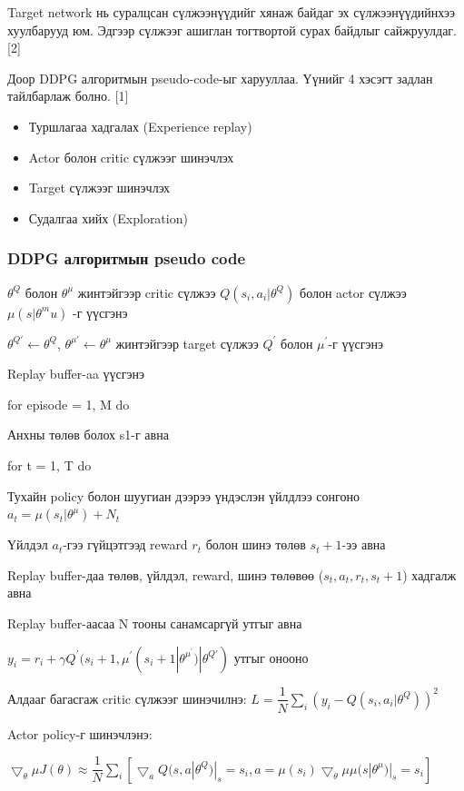 \documentclass[12pt,A4]{report}
\begin{document}
Target network нь суралцсан сүлжээнүүдийг хянаж байдаг эх сүлжээнүүдийнхээ хуулбарууд юм. Эдгээр сүлжээг ашиглан тогтвортой сурах байдлыг сайжруулдаг.	 [2]

Доор DDPG алгоритмын pseudo-code-ыг харууллаа. Үүнийг 4 хэсэгт задлан тайлбарлаж болно. [1]

\begin{itemize}
	\item Туршлагаа хадгалах (Experience replay)
	\item Actor болон critic сүлжээг шинэчлэх
	\item Target сүлжээг шинэчлэх
	\item Судалгаа хийх (Exploration)
\end{itemize} 

\subsubsection{DDPG алгоритмын pseudo code}

$\theta^Q$ болон $\theta^{\mu}$ жинтэйгээр critic сүлжээ $Q(s_i,a_i|\theta^Q)$ болон actor сүлжээ $\mu(s|\theta^mu)$ -г үүсгэнэ

$\theta^{Q{'}} \longleftarrow \theta^Q$, $\theta^{\mu{'}} \longleftarrow \theta^\mu$ жинтэйгээр target сүлжээ $Q^{'}$ болон $\mu^{'}$-г үүсгэнэ

Replay buffer-aa үүсгэнэ

for episode = 1, M do

\quad Анхны төлөв болох s1-г авна

\quad for t = 1, T do

\quad\quad Тухайн policy болон шуугиан дээрээ үндэслэн үйлдлээ сонгоно $a_t = \mu(s_t|\theta^\mu)+N_t$

\quad\quad Үйлдэл $a_t$-гээ гүйцэтгээд reward $r_t$ болон шинэ төлөв $s_t+1$-ээ авна

\quad\quad Replay buffer-даа төлөв, үйлдэл, reward, шинэ төлөвөө ($s_t, a_t, r_t, s_t+1$) хадгалж авна

\quad\quad Replay buffer-аасаа N тооны санамсаргүй утгыг авна

\quad\quad $y_i=r_i+\gamma{Q^{'}}(s_i+1,\mu^{'}(s_i+1|\theta^{\mu^{'}})|\theta^{Q{'}})$ утгыг онооно

\quad\quad Алдааг багасгаж critic сүлжээг шинэчилнэ: $L = \dfrac{1}{N}\sum_{i}(y_i-Q(s_i,a_i|\theta^Q))^2$

\quad\quad Actor policy-г шинэчлэнэ: 
\begin{center}
$\bigtriangledown_\theta\mu J(\theta) \approx \dfrac{1}{N}\sum_{i}[\bigtriangledown_a Q(s, a|\theta^Q)|_s=s_i,a=\mu(s_i)\bigtriangledown_\theta\mu \mu(s|\theta^\mu)|_s=s_i]$
\end{center}
\end{document}
